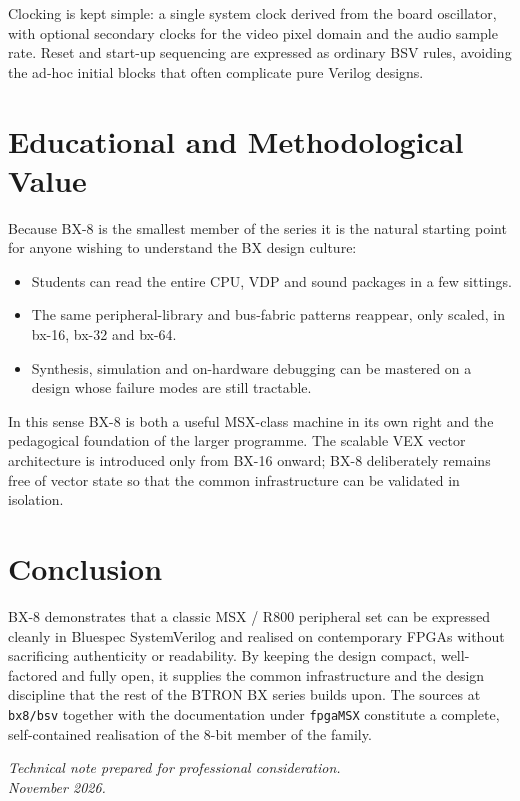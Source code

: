 \documentclass[11pt,a4paper]{article}
\begin{document}
Clocking is kept simple: a single system clock derived from the board oscillator, with optional secondary clocks for the video pixel domain and the audio sample rate. Reset and start-up sequencing are expressed as ordinary BSV rules, avoiding the ad-hoc initial blocks that often complicate pure Verilog designs.

\section{Educational and Methodological Value}

Because BX-8 is the smallest member of the series it is the natural starting point for anyone wishing to understand the BX design culture:
\begin{itemize}[leftmargin=1.5em]
  \item Students can read the entire CPU, VDP and sound packages in a few sittings.
  \item The same peripheral-library and bus-fabric patterns reappear, only scaled, in bx-16, bx-32 and bx-64.
  \item Synthesis, simulation and on-hardware debugging can be mastered on a design whose failure modes are still tractable.
\end{itemize}

In this sense BX-8 is both a useful MSX-class machine in its own right and the pedagogical foundation of the larger programme. The scalable VEX vector architecture is introduced only from BX-16 onward; BX-8 deliberately remains free of vector state so that the common infrastructure can be validated in isolation.

\section{Conclusion}

BX-8 demonstrates that a classic MSX / R800 peripheral set can be expressed cleanly in Bluespec SystemVerilog and realised on contemporary FPGAs without sacrificing authenticity or readability. By keeping the design compact, well-factored and fully open, it supplies the common infrastructure and the design discipline that the rest of the BTRON BX series builds upon. The sources at \texttt{bx8/bsv} together with the documentation under \texttt{fpgaMSX} constitute a complete, self-contained realisation of the 8-bit member of the family.

\vspace{1.5em}
\noindent\textit{Technical note prepared for professional consideration.\\
November 2026.}
\end{document}
